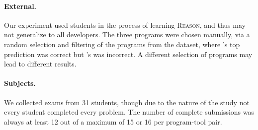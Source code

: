 \paragraph{External.}
%
Our experiment used students in the process of learning \textsc{Reason},
and thus may not generalize to all developers. The three programs were
chosen manually, via a random selection and filtering of the programs
from the \SPRING dataset, where \toolname's top prediction was correct
but \sherrloc's was incorrect. A different selection of programs may
lead to different results.

\paragraph{Subjects.}
%
We collected exams from 31 students, though due to the nature of the
study not every student completed every problem.
%
The number of complete submissions was always at least 12 out of
a maximum of 15 or 16 per program-tool pair.
%
